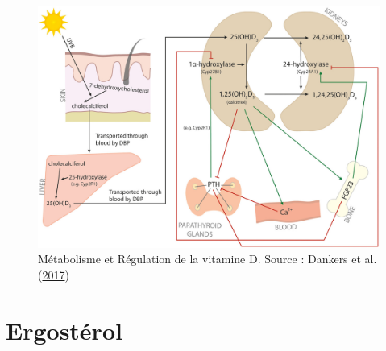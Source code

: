 \documentclass[
  a4paper,
  DIV=11,
  numbers=noendperiod,
  listof=totoc]{scrreprt}
\begin{document}
\begin{figure}

{\centering \includegraphics{figures/vitamin-d-metabolism-regulation.jpg}

}

\caption{\label{fig-reg-vitd}Métabolisme et Régulation de la vitamine D.
Source : Dankers et al. (\protect\hyperlink{ref-Dankers.2017}{2017})}

\end{figure}

\hypertarget{ergostuxe9rol}{%
\section{Ergostérol}\label{ergostuxe9rol}}
\end{document}
